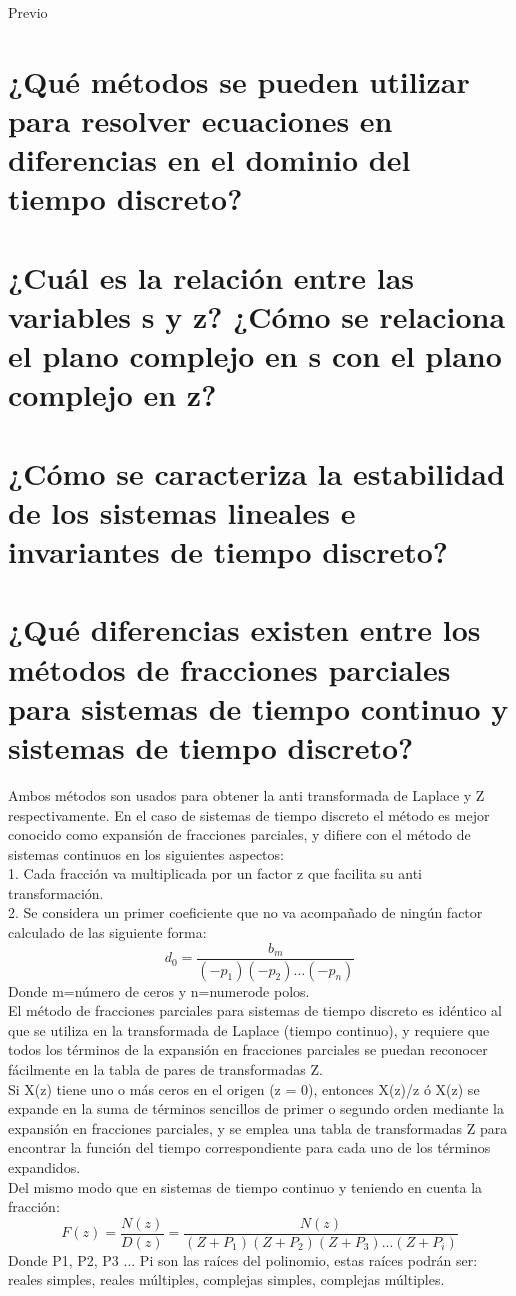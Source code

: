 {\Huge Previo }

\noindent \justifying


\section{¿Qué métodos se pueden utilizar para resolver ecuaciones en diferencias en el dominio del tiempo discreto?} 
\section{¿Cuál es la relación entre las variables s y z? ¿Cómo se relaciona el plano complejo en s con el plano complejo en z?}
\section{¿Cómo se caracteriza la estabilidad de los sistemas lineales e invariantes de tiempo discreto?}
\section{¿Qué diferencias existen entre los métodos de fracciones parciales para sistemas de tiempo continuo y sistemas de tiempo discreto?}
\newline
Ambos métodos son usados para obtener la anti transformada de Laplace y Z respectivamente. En el caso de sistemas de tiempo discreto el método es mejor conocido como expansión de fracciones parciales, y difiere con el método de sistemas continuos en los siguientes aspectos:\\
1. Cada fracción va multiplicada por un factor z que facilita su anti transformación.\\
2. Se considera un primer coeficiente que no va acompañado de ningún factor calculado de las siguiente forma:\\
\[
d_{0}=\frac{b_{m}} {(−p_{1})(−p_{2})...(−p_{n})}
\]
Donde m=número de ceros y n=numerode polos.\\    
El método de fracciones parciales para sistemas de tiempo discreto es idéntico al que se utiliza en la transformada de Laplace (tiempo continuo), y requiere que todos los términos de la expansión en fracciones parciales se puedan reconocer fácilmente en la tabla de pares de transformadas Z.\\
Si X(z) tiene uno o más ceros en el origen (z = 0), entonces X(z)/z ó X(z) se expande en la suma de términos sencillos de primer o segundo orden mediante la expansión en fracciones parciales, y se emplea una tabla de transformadas Z para encontrar la función del tiempo correspondiente para cada uno de los términos expandidos.\\    
Del mismo modo que en sistemas de tiempo continuo y teniendo en cuenta la fracción:\\
\[
F(z)=\frac{N(z)}{D(z)}=\frac{N(z)}{(Z+P_{1})(Z+P_{2})(Z+P_{3})...(Z+P_{i})}
\]
Donde P1, P2, P3 ... Pi son las raíces del polinomio, estas raíces podrán ser: reales simples, reales múltiples, complejas simples, complejas múltiples.

